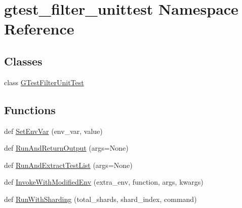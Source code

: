 \hypertarget{namespacegtest__filter__unittest}{}\section{gtest\+\_\+filter\+\_\+unittest Namespace Reference}
\label{namespacegtest__filter__unittest}
\subsection*{Classes}
\begin{DoxyCompactItemize}
\item 
class \hyperlink{classgtest__filter__unittest_1_1GTestFilterUnitTest}{G\+Test\+Filter\+Unit\+Test}
\end{DoxyCompactItemize}
\subsection*{Functions}
\begin{DoxyCompactItemize}
\item 
def \hyperlink{namespacegtest__filter__unittest_a8ba027a73134bf97696651252457b492}{Set\+Env\+Var} (env\+\_\+var, value)
\item 
def \hyperlink{namespacegtest__filter__unittest_abb83ed30067e0d13161fd89868ed476b}{Run\+And\+Return\+Output} (args=None)
\item 
def \hyperlink{namespacegtest__filter__unittest_aaf6916ce9c936a238afeb79a4d326a12}{Run\+And\+Extract\+Test\+List} (args=None)
\item 
def \hyperlink{namespacegtest__filter__unittest_a2bfd6ae10e7002148bc25e505bd61534}{Invoke\+With\+Modified\+Env} (extra\+\_\+env, function, args, kwargs)
\item 
def \hyperlink{namespacegtest__filter__unittest_a4d88cc7e4faf5305640a66dc487b33fb}{Run\+With\+Sharding} (total\+\_\+shards, shard\+\_\+index, command)
\end{DoxyCompactItemize}
